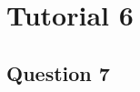 \documentclass[12pt]{article}
\begin{document}
\section{Tutorial 6}
\subsection{Question 7}


\end{document}
